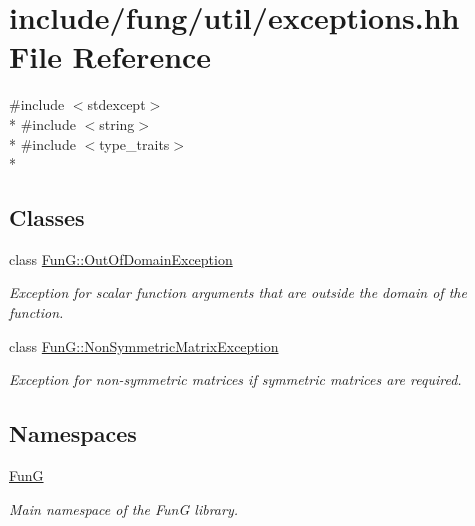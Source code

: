 \hypertarget{exceptions_8hh}{\section{include/fung/util/exceptions.hh File Reference}
\label{exceptions_8hh}
}
{\ttfamily \#include $<$stdexcept$>$}\\*
{\ttfamily \#include $<$string$>$}\\*
{\ttfamily \#include $<$type\-\_\-traits$>$}\\*
\subsection*{Classes}
\begin{DoxyCompactItemize}
\item 
class \hyperlink{classFunG_1_1OutOfDomainException}{Fun\-G\-::\-Out\-Of\-Domain\-Exception}
\begin{DoxyCompactList}\small\item\em Exception for scalar function arguments that are outside the domain of the function. \end{DoxyCompactList}\item 
class \hyperlink{classFunG_1_1NonSymmetricMatrixException}{Fun\-G\-::\-Non\-Symmetric\-Matrix\-Exception}
\begin{DoxyCompactList}\small\item\em Exception for non-\/symmetric matrices if symmetric matrices are required. \end{DoxyCompactList}\end{DoxyCompactItemize}
\subsection*{Namespaces}
\begin{DoxyCompactItemize}
\item 
\hyperlink{namespaceFunG}{Fun\-G}
\begin{DoxyCompactList}\small\item\em Main namespace of the Fun\-G library. \end{DoxyCompactList}\end{DoxyCompactItemize}

